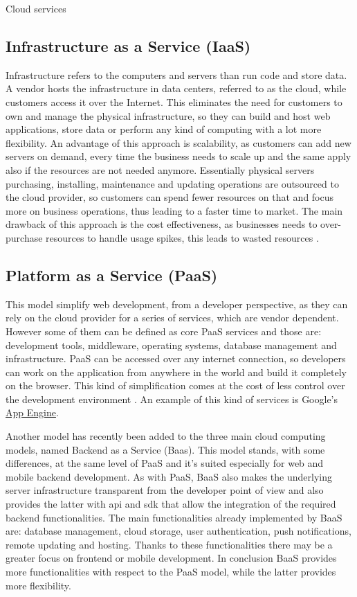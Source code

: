 \begin{chapter}{Cloud services}
    \subsection{Infrastructure as a Service (IaaS)}
    Infrastructure refers to the computers and servers than run code and store data.
    A vendor hosts the infrastructure in data centers, referred to as the cloud,
    while customers access it over the Internet. This eliminates the need for customers
    to own and manage the physical infrastructure, so they can build and host web
    applications, store data or perform any kind of computing with a lot more flexibility.
    An advantage of this approach is scalability, as customers can add new servers
    on demand, every time the business needs to scale up and the same apply also
    if the resources are not needed anymore. Essentially physical servers purchasing,
    installing, maintenance and updating operations are outsourced to the cloud
    provider, so customers can spend fewer resources on that and focus more on business
    operations, thus leading to a faster time to market. The main drawback of this
    approach is the cost effectiveness, as businesses needs to over-purchase resources
    to handle usage spikes, this leads to wasted resources \cite{iaas}.

    \subsection{Platform as a Service (PaaS)}
    This model simplify web development, from a developer perspective, as they can
    rely on the cloud provider for a series of services, which are vendor dependent.
    However some of them can be defined as core PaaS services and those are: development
    tools, middleware, operating systems, database management and infrastructure.
    PaaS can be accessed over any internet connection, so developers can work on
    the application from anywhere in the world and build it completely on the browser.
    This kind of simplification comes at the cost of less control over the development
    environment \cite{paas}. An example of this kind of services is Google's
    \href{https://cloud.google.com/appengine}{App Engine}.

    \smallskip
    Another model has recently been added to the three main cloud computing models,
    named Backend as a Service (Baas). This model stands, with some differences,
    at the same level of PaaS and it's suited especially for web and mobile backend
    development. As with PaaS, BaaS also makes the underlying server infrastructure
    transparent from the developer point of view and also provides the latter with
    api and sdk that allow the integration of the required backend functionalities.
    The main functionalities already implemented by BaaS are: database management,
    cloud storage, user authentication, push notifications, remote updating and hosting.
    Thanks to these functionalities there may be a greater focus on frontend or mobile
    development.
    In conclusion BaaS provides more functionalities with respect to the PaaS model,
    while the latter provides more flexibility.


\end{chapter}
